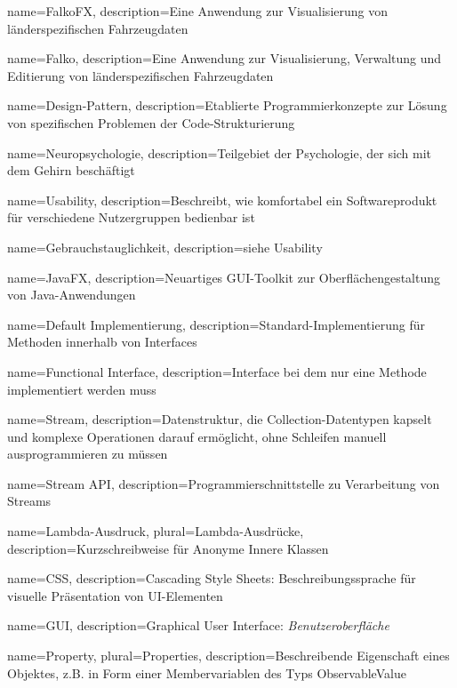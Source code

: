  {
	name=FalkoFX,
	description={Eine Anwendung zur Visualisierung von länderspezifischen Fahrzeugdaten}
}

 {
	name=Falko,
	description={Eine Anwendung zur Visualisierung, Verwaltung und Editierung von länderspezifischen Fahrzeugdaten}
}

 {
	name=Design-Pattern,
	description={Etablierte Programmierkonzepte zur Lösung von spezifischen Problemen der Code-Strukturierung}
}

 {
	name=Neuropsychologie,
	description={Teilgebiet der Psychologie, der sich mit dem Gehirn beschäftigt}
}

 {
	name=Usability,
	description={Beschreibt, wie komfortabel ein Softwareprodukt für verschiedene Nutzergruppen bedienbar ist}
}

 {
	name=Gebrauchstauglichkeit,
	description={siehe Usability}
}

 {
	name=JavaFX,
	description={Neuartiges GUI-Toolkit zur Oberflächengestaltung von Java-Anwendungen}
}

 {
	name=Default Implementierung,
	description={Standard-Implementierung für Methoden innerhalb von Interfaces}
}

 {
	name=Functional Interface,
	description={Interface bei dem nur eine Methode implementiert werden muss}
}

 {
	name=Stream,
	description={Datenstruktur, die Collection-Datentypen kapselt und komplexe Operationen darauf ermöglicht, ohne Schleifen manuell ausprogrammieren zu müssen}
}

 {
	name=Stream API,
	description={Programmierschnittstelle zu Verarbeitung von Streams}
}

 {
	name=Lambda-Ausdruck,
	plural=Lambda-Ausdrücke,
	description={Kurzschreibweise für Anonyme Innere Klassen}
}

 {
	name=CSS,
	description={Cascading Style Sheets: Beschreibungssprache für visuelle Präsentation von UI-Elementen}
}

 {
	name=GUI,
	description={Graphical User Interface: \textit{Benutzeroberfläche}}
}

 {
	name=Property,
	plural=Properties,
	description={Beschreibende Eigenschaft eines Objektes, z.B. in Form einer Membervariablen des Typs ObservableValue}
}

